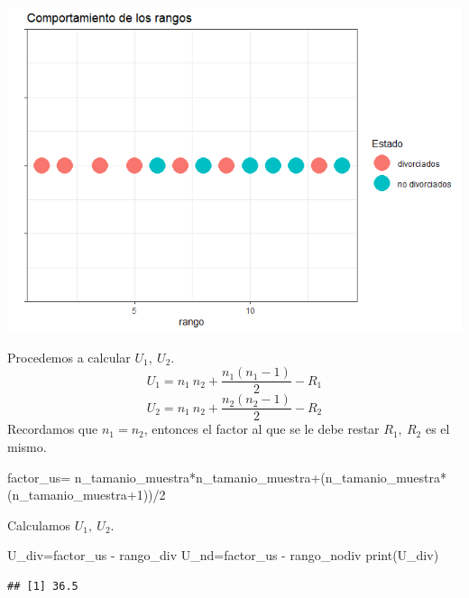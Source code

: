 \documentclass[
]{article}
\newenvironment{Shaded}{\begin{snugshade}}{\end{snugshade}}
\newcommand{\DecValTok}[1]{\textcolor[rgb]{0.00,0.00,0.81}{#1}}
\newcommand{\FunctionTok}[1]{\textcolor[rgb]{0.00,0.00,0.00}{#1}}
\newcommand{\NormalTok}[1]{#1}
\newcommand{\OtherTok}[1]{\textcolor[rgb]{0.56,0.35,0.01}{#1}}
\newcommand{\SpecialCharTok}[1]{\textcolor[rgb]{0.00,0.00,0.00}{#1}}
\begin{document}
\includegraphics{Pruebas_p_files/figure-html/unnamed-chunk-87-1.png}

Procedemos a calcular \(U_{1}, \ U_{2}\).
\[U_{1}= n_{1} \ n_{2} + \frac{n_{1} (n_{1}-1)}{2} - R_{1}\]
\[U_{2}= n_{1} \ n_{2} + \frac{n_{2} (n_{2}-1)}{2} - R_{2}\] Recordamos
que \(n_{1}=n_{2}\), entonces el factor al que se le debe restar
\(R_{1}, \  R_{2}\) es el mismo.

\begin{Shaded}
\begin{Highlighting}[]
\NormalTok{factor\_us}\OtherTok{=}\NormalTok{ n\_tamanio\_muestra}\SpecialCharTok{*}\NormalTok{n\_tamanio\_muestra}\SpecialCharTok{+}\NormalTok{(n\_tamanio\_muestra}\SpecialCharTok{*}\NormalTok{(n\_tamanio\_muestra}\SpecialCharTok{+}\DecValTok{1}\NormalTok{))}\SpecialCharTok{/}\DecValTok{2}
\end{Highlighting}
\end{Shaded}

Calculamos \(U_{1}, \ U_{2}\).

\begin{Shaded}
\begin{Highlighting}[]
\NormalTok{U\_div}\OtherTok{=}\NormalTok{factor\_us }\SpecialCharTok{{-}}\NormalTok{ rango\_div}
\NormalTok{U\_nd}\OtherTok{=}\NormalTok{factor\_us }\SpecialCharTok{{-}}\NormalTok{ rango\_nodiv}
\FunctionTok{print}\NormalTok{(U\_div)}
\end{Highlighting}
\end{Shaded}

\begin{verbatim}
## [1] 36.5
\end{verbatim}
\end{document}
